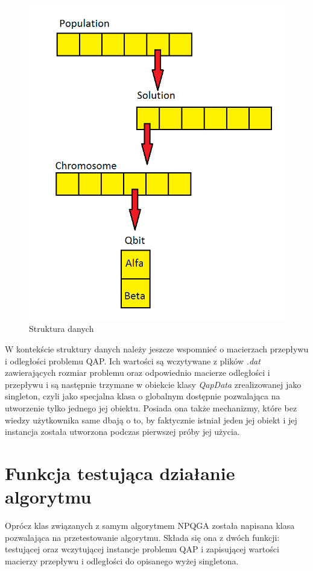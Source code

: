 \begin{figure}[!t]
\begin{center}
\includegraphics[scale=0.4]{data_structure}
\caption{Struktura danych}
\end{center}
\end{figure}

W kontekście struktury danych należy jeszcze wspomnieć o macierzach przepływu i odległości problemu QAP. Ich wartości są wczytywane z plików \textit{.dat} zawierających rozmiar problemu oraz odpowiednio macierze odległości i przepływu i są następnie trzymane w obiekcie klasy \textit{QapData} zrealizowanej jako singleton, czyli jako specjalna klasa o globalnym dostępnie pozwalająca na utworzenie tylko jednego jej obiektu. Posiada ona także mechanizmy, które bez wiedzy użytkownika same dbają o to, by faktycznie istniał jeden jej obiekt i jej instancja została utworzona podczas pierwszej próby jej użycia.

\section{Funkcja testująca działanie algorytmu}
Oprócz klas związanych z samym algorytmem NPQGA została napisana klasa pozwalająca na przetestowanie algorytmu. Składa się ona z dwóch funkcji: testującej oraz wczytującej instancje problemu QAP i zapisującej wartości macierzy przepływu i odległości do opisanego wyżej singletona.

